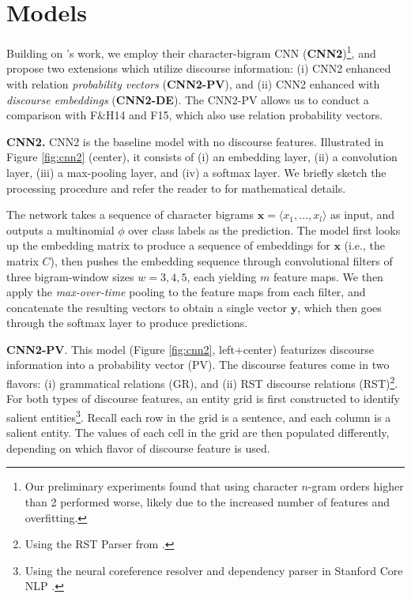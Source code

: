 \section{Models}
\label{sec:longer2_models}

Building on 's work,
 we employ their character-bigram CNN (\textbf{CNN2})\footnote{Our preliminary experiments found that using character $n$-gram orders higher than 2 performed worse, likely due to the increased number of features and overfitting.}, and propose two extensions which utilize discourse information:
(i) CNN2 enhanced with relation \emph{probability vectors} (\textbf{CNN2-PV}), and (ii) CNN2 enhanced with \emph{discourse embeddings} (\textbf{CNN2-DE}). 
The CNN2-PV allows us to conduct a comparison with F\&H14 and F15, which also use relation probability vectors. 
\medskip

\noindent
\textbf{CNN2.}
CNN2 is the baseline model with no discourse features. Illustrated in Figure \ref{fig:cnn2} (center), it consists of (i) an embedding layer, (ii) a convolution layer, (iii) a max-pooling layer, and (iv) a softmax layer.
We briefly sketch the processing procedure and refer the reader to \citep[Section 2]{Shrestha:2017} for mathematical details.

The network takes a sequence of character bigrams $\bm{x} = \langle x_1,\ldots,x_l\rangle$ as input, and outputs a multinomial $\phi$ over class labels as the prediction.
The model first looks up the embedding matrix to produce a sequence of embeddings for $\bm{x}$ (i.e., the matrix $C$), then pushes the embedding sequence through convolutional filters of three bigram-window sizes $w=3,4,5$, each yielding $m$ feature maps. 
We then apply the \emph{max-over-time} pooling \cite{Collobert:2011} to the feature maps from each filter, and concatenate the resulting vectors to obtain a single vector $\bm{y}$, which then goes through the softmax layer to produce predictions.


\medskip
\noindent
\textbf{CNN2-PV}.
This model (Figure \ref{fig:cnn2}, left+center) featurizes discourse information into a probability vector (PV). 
The discourse features come in two flavors: (i) grammatical relations (GR), and (ii) RST discourse relations (RST)\footnote{Using the RST Parser from \citet{Ji:2014}.}. For both types of discourse features, an entity grid is first constructed to identify salient entities\footnote{Using the neural coreference resolver and dependency parser in Stanford Core NLP \cite{Clark:2016}.}. Recall each row in the grid is a sentence, and each column is a salient entity. The values of each cell in the grid are then populated differently, depending on which flavor of discourse feature is used. 

